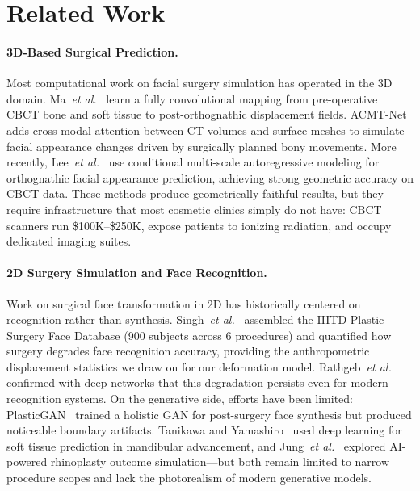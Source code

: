 \documentclass[runningheads]{llncs}
\newcommand{\etal}{\textit{et al.}}
\begin{document}
\section{Related Work}
\label{sec:related}

\paragraph{3D-Based Surgical Prediction.}
Most computational work on facial surgery simulation has operated in the
3D domain.  Ma~\etal~\cite{ma2021fcnet} learn a fully convolutional mapping
from pre-operative CBCT bone and soft tissue to post-orthognathic
displacement fields.  ACMT-Net~\cite{fang2022acmtnet} adds cross-modal
attention between CT volumes and surface meshes to simulate facial
appearance changes driven by surgically planned bony movements.
More recently, Lee~\etal~\cite{lee2025camos} use conditional multi-scale
autoregressive modeling for orthognathic facial appearance prediction,
achieving strong geometric accuracy on CBCT data.  These methods
produce geometrically faithful results, but they require infrastructure
that most cosmetic clinics simply do not have: CBCT scanners run
\$100K--\$250K, expose patients to ionizing radiation, and occupy
dedicated imaging suites.

\paragraph{2D Surgery Simulation and Face Recognition.}
Work on surgical face transformation in 2D has historically centered on
recognition rather than synthesis.  Singh~\etal~\cite{singh2010plastic}
assembled the IIITD Plastic Surgery Face Database (900 subjects across 6
procedures) and quantified how surgery degrades face recognition accuracy,
providing the anthropometric displacement statistics we draw on for our
deformation model.  Rathgeb~\etal~\cite{rathgeb2020obstacle} confirmed
with deep networks that this degradation persists even for modern
recognition systems.  On the generative side, efforts have been limited:
PlasticGAN~\cite{chandaliya2022plasticgan} trained a holistic GAN for
post-surgery face synthesis but produced noticeable boundary artifacts.
Tanikawa and Yamashiro~\cite{tanikawa2021soft} used deep learning for
soft tissue prediction in mandibular advancement, and
Jung~\etal~\cite{jung2024rhinoplasty} explored AI-powered rhinoplasty
outcome simulation---but both remain limited to narrow procedure scopes
and lack the photorealism of modern generative models.
\end{document}

